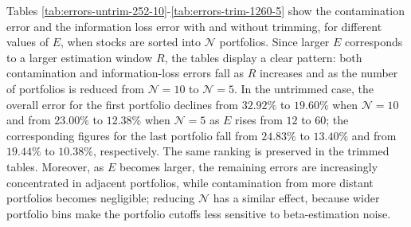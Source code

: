 Tables \ref{tab:errors-untrim-252-10}-\ref{tab:errors-trim-1260-5} show the contamination error and the information loss error with and without trimming, for different values of $E$, when stocks are sorted into $\mathcal{N}$ portfolios. Since larger $E$ corresponds to a larger estimation window $R$, the tables display a clear pattern: both contamination and information-loss errors fall as $R$ increases and as the number of portfolios is reduced from $\mathcal{N}=10$ to $\mathcal{N}=5$. In the untrimmed case, the overall error for the first portfolio declines from $32.92\%$ to $19.60\%$ when $\mathcal{N}=10$ and from $23.00\%$ to $12.38\%$ when $\mathcal{N}=5$ as $E$ rises from $12$ to $60$; the corresponding figures for the last portfolio fall from $24.83\%$ to $13.40\%$ and from $19.44\%$ to $10.38\%$, respectively. The same ranking is preserved in the trimmed tables. Moreover, as $E$ becomes larger, the remaining errors are increasingly concentrated in adjacent portfolios, while contamination from more distant portfolios becomes negligible; reducing $\mathcal{N}$ has a similar effect, because wider portfolio bins make the portfolio cutoffs less sensitive to beta-estimation noise.

 

 

 

 

 



 

 

 

 

 


